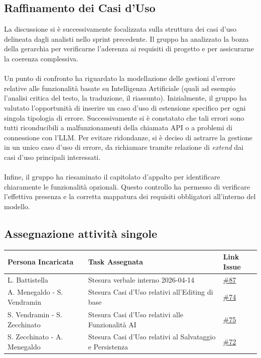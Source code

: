 \documentclass[a4paper, 10pt, colorlinks=true, linkcolor=black, urlcolor=blue, citecolor=blue, hidelinks]{article}
\newcommand{\issue}[1]{\href{https://github.com/thebitless-group-swe/thebitless.github.io/issues/#1}{\##1}}
\begin{document}
\subsection{Raffinamento dei Casi d'Uso}
La discussione si è successivamente focalizzata sulla struttura dei casi d'uso delineata dagli analisti nello sprint precedente. Il gruppo ha analizzato la bozza della gerarchia per verificarne l'aderenza ai requisiti di progetto e per assicurarne la coerenza complessiva.\\
\\
Un punto di confronto ha riguardato la modellazione delle gestioni d'errore relative alle funzionalità basate su Intelligenza Artificiale (quali ad esempio l'analisi critica del testo, la traduzione, il riassunto). Inizialmente, il gruppo ha valutato l'opportunità di inserire un caso d'uso di estensione specifico per ogni singola tipologia di errore. Successivamente si è constatato che tali errori sono tutti riconducibili a malfunzionamenti della chiamata API o a problemi di connessione con l'LLM. Per evitare ridondanze, si è deciso di astrarre la gestione in un unico caso d'uso di errore, da richiamare tramite relazione di \textit{extend} dai casi d'uso principali interessati. \\
\\
Infine, il gruppo ha riesaminato il capitolato d'appalto per identificare chiaramente le funzionalità opzionali. Questo controllo ha permesso di verificare l'effettiva presenza e la corretta mappatura dei requisiti obbligatori all'interno del modello.

\subsection{Assegnazione attività singole}
\begin{center}
    \renewcommand{\arraystretch}{1.4}
        \begin{tabular}{|p{4.2cm}|p{6.2cm}|p{2.2cm}|}
        \hline
        \textbf{Persona Incaricata} & \textbf{Task Assegnata} & \centering\textbf{Link Issue} \tabularnewline
        \hline
        L. Battistella & Stesura verbale interno 2026-04-14 & \issue{87} \\
        \hline
        A. Menegaldo - S. Vendramin & Stesura Casi d'Uso relativi all'Editing di base & \issue{74} \\
        \hline
        S. Vendramin - S. Zecchinato & Stesura Casi d'Uso relativi alle Funzionalità AI & \issue{75} \\
        \hline
        S. Zecchinato - A. Menegaldo & Stesura Casi d'Uso relativi al Salvataggio e Persistenza & \issue{72} \\
        \hline
    \end{tabular}
\end{center}

\appendix
\end{document}
